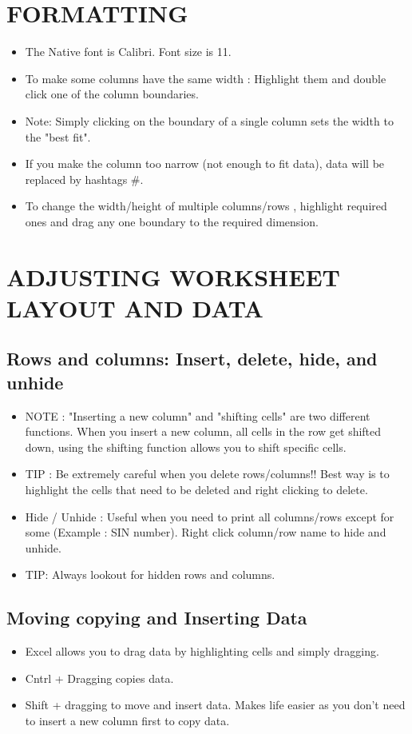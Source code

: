 \documentclass[11pt, oneside]{article}   	%
\begin{document}
\section{FORMATTING}
\begin{itemize}
\item The Native font is Calibri. Font size is 11.
\item To make some columns have the same width : Highlight them and double click one of the column boundaries.
\item Note: Simply clicking on the boundary of a single column sets the width to the "best fit".
\item If you make the column too narrow (not enough to fit data), data will be replaced by hashtags \#.
\item To change the width/height of multiple columns/rows , highlight required ones and drag any one boundary to the required dimension.
\end{itemize}
\section{ADJUSTING WORKSHEET LAYOUT AND DATA}
\subsection{Rows and columns: Insert, delete, hide, and unhide}
\begin{itemize}
\item NOTE : "Inserting a new column" and "shifting cells" are two different functions. When you insert a new column, all cells in the row get shifted down, using the shifting function allows you to shift specific cells.
\item TIP : Be extremely careful when you delete rows/columns!! Best way is to highlight the cells that need to be deleted and right clicking to delete.
\item Hide / Unhide : Useful when you need to print all columns/rows except for some (Example : SIN number). Right click column/row name to hide and unhide.
\item TIP: Always lookout for hidden rows and columns.
\end{itemize}
\subsection{Moving copying and Inserting Data}
\begin{itemize}
\item Excel allows you to drag data by highlighting cells and simply dragging.
\item Cntrl + Dragging copies data.
\item Shift + dragging to move and insert data. Makes life easier as you don't need to insert a new column first to copy data.
\end{itemize}
\end{document}
